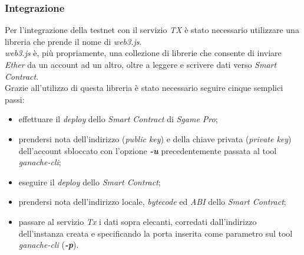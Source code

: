 \documentclass[11pt]{thesistemp}
\begin{document}
\subsubsection{Integrazione}

Per l'integrazione della testnet con il servizio \textit{TX} è stato necessario utilizzare una libreria che prende il nome di \textit{web3.js}.\\
\textit{web3.js} è, più propriamente, una collezione di librerie che consente di inviare \textit{Ether} da un account ad un altro, oltre a leggere e scrivere dati verso \textit{Smart Contract}.\\
Grazie all'utilizzo di questa libreria è stato necessario seguire cinque semplici passi:
\begin{itemize}
	\item effettuare il \textit{deploy} dello \textit{Smart Contract} di \textit{Sgame Pro};
	\item prendersi nota dell'indirizzo (\textit{public key}) e della chiave privata (\textit{private key}) dell'account sbloccato con l'opzione \textbf{\textit{-u}} precedentemente passata al tool \textit{ganache-cli};
	\item eseguire il \textit{deploy} dello \textit{Smart Contract};
	\item prendersi nota dell'indirizzo locale, \textit{bytecode} ed \textit{ABI} dello \textit{Smart Contract};
	\item passare al servizio  \textit{Tx} i dati sopra elecanti, corredati dall'indirizzo dell'instanza creata e specificando la porta inserita come parametro sul tool \textit{ganache-cli} (\textbf{\textit{-p}}).
\end{itemize}
\end{document}
